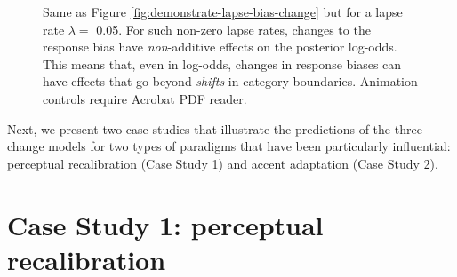 \documentclass[
  11pt,
  english,
  man,floatsintext]{apa6}
\begin{document}
\begin{figure}

{\centering {}

}

\caption[Same as Figure \ref{fig:demonstrate-lapse-bias-change} but for a lapse rate \(\lambda=\) 0.05. For such non-zero lapse rates, changes to the response bias have \emph{non}-additive effects on the posterior log-odds. This means that, even in log-odds, changes in response biases can have effects that go beyond \emph{shifts} in category boundaries. Animation controls require Acrobat PDF reader.]{Same as Figure \ref{fig:demonstrate-lapse-bias-change} but for a lapse rate \(\lambda=\) 0.05. For such non-zero lapse rates, changes to the response bias have \emph{non}-additive effects on the posterior log-odds. This means that, even in log-odds, changes in response biases can have effects that go beyond \emph{shifts} in category boundaries. Animation controls require Acrobat PDF reader.}\label{fig:demonstrate-lapse-bias-change-nonzero-lapse}
\end{figure}

Next, we present two case studies that illustrate the predictions of the three change models for two types of paradigms that have been particularly influential: perceptual recalibration (Case Study 1) and accent adaptation (Case Study 2).

\hypertarget{case-study-1-perceptual-recalibration}{%
\section{Case Study 1: perceptual recalibration}\label{case-study-1-perceptual-recalibration}}
\end{document}
